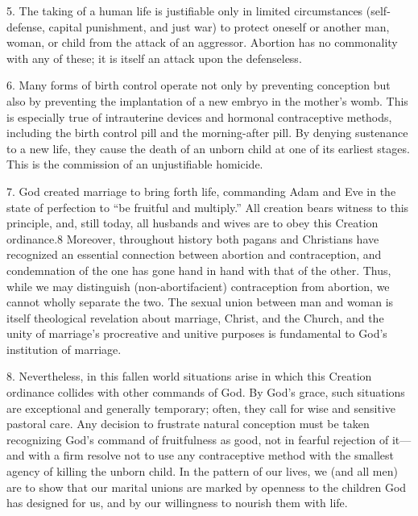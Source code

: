 \documentclass[
]{book}
\begin{document}
5. The taking of a human life is justifiable only in limited circumstances (self-defense, capital punishment, and just war) to protect oneself or another man, woman, or child from the attack of an aggressor. Abortion has no commonality with any of these; it is itself an attack upon the defenseless.

6. Many forms of birth control operate not only by preventing conception but also by preventing the implantation of a new embryo in the mother's womb. This is especially true of intrauterine devices and hormonal contraceptive methods, including the birth control pill and the morning-after pill. By denying sustenance to a new life, they cause the death of an unborn child at one of its earliest stages. This is the commission of an unjustifiable homicide.

7. God created marriage to bring forth life, commanding Adam and Eve in the state of perfection to ``be fruitful and multiply.'' All creation bears witness to this principle, and, still today, all husbands and wives are to obey this Creation ordinance.8 Moreover, throughout history both pagans and Christians have recognized an essential connection between abortion and contraception, and condemnation of the one has gone hand in hand with that of the other. Thus, while we may distinguish (non-abortifacient) contraception from abortion, we cannot wholly separate the two. The sexual union between man and woman is itself theological revelation about marriage, Christ, and the Church, and the unity of marriage's procreative and unitive purposes is fundamental to God's institution of marriage.

8. Nevertheless, in this fallen world situations arise in which this Creation ordinance collides with other commands of God. By God's grace, such situations are exceptional and generally temporary; often, they call for wise and sensitive pastoral care. Any decision to frustrate natural conception must be taken recognizing God's command of fruitfulness as good, not in fearful rejection of it---and with a firm resolve not to use any contraceptive method with the smallest agency of killing the unborn child. In the pattern of our lives, we (and all men) are to show that our marital unions are marked by openness to the children God has designed for us, and by our willingness to nourish them with life.
\end{document}
